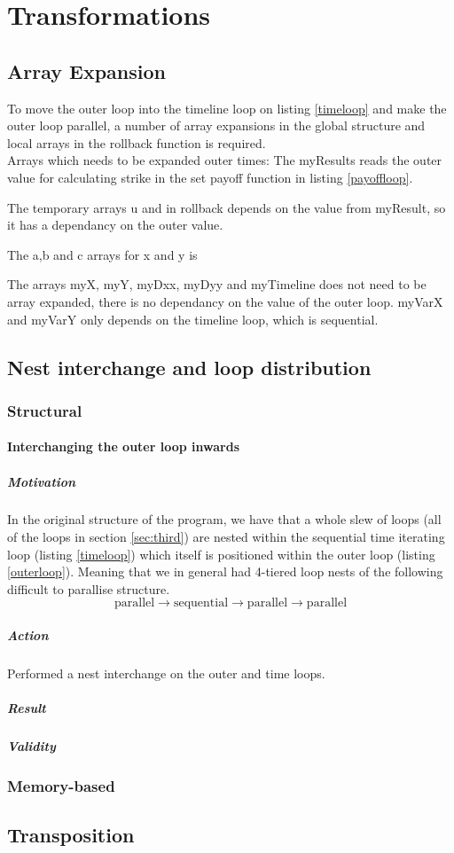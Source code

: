 \section{Transformations}

\subsection{Array Expansion}
To move the outer loop into the timeline loop on listing \ref{timeloop} and make the outer loop parallel, a number of array expansions in the global structure and local arrays in the rollback function is required.\\

Arrays which needs to be expanded outer times: 
The myResults reads the outer value for calculating strike in the set payoff function in listing \ref{payoffloop}.

The temporary arrays u and in rollback depends on the value from myResult, so it has a dependancy on the outer value. 


The a,b and c arrays for x and y is 

The arrays myX, myY, myDxx, myDyy and myTimeline does not need to be array expanded, there is no dependancy on the value of the outer loop. myVarX and myVarY only depends on the timeline loop, which is sequential.

\subsection{Nest interchange and loop distribution}

\subsubsection{Structural}
\paragraph{Interchanging the outer loop inwards}
\subparagraph{Motivation} In the original structure of the program, we have that a whole slew of loops
 (all of the loops in section \ref{sec:third}) are nested
 within the sequential time iterating loop (listing \ref{timeloop}) which itself is positioned within
 the outer loop (listing \ref{outerloop}). Meaning that we in general had 4-tiered loop nests of the following difficult to parallise
 structure.
$$\mathrm{parallel} \to \mathrm{sequential} \to \mathrm{parallel} \to \mathrm{parallel}$$

\subparagraph{Action} Performed a nest interchange on the outer and time loops.

\subparagraph{Result}

\subparagraph{Validity}


\subsubsection{Memory-based}


\subsection{Transposition}

